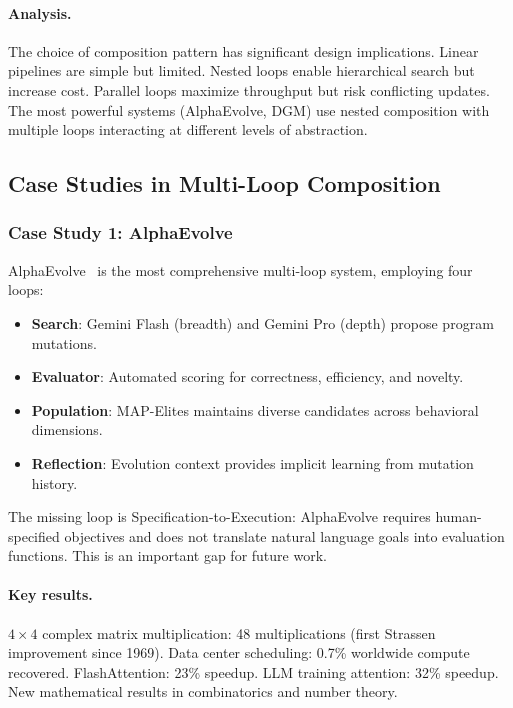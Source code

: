 \paragraph{Analysis.}
The choice of composition pattern has significant design implications. Linear pipelines are simple but limited. Nested loops enable hierarchical search but increase cost. Parallel loops maximize throughput but risk conflicting updates. The most powerful systems (AlphaEvolve, DGM) use nested composition with multiple loops interacting at different levels of abstraction.


\subsection{Case Studies in Multi-Loop Composition}
\label{sec:case-studies}

\subsubsection{Case Study 1: AlphaEvolve}

AlphaEvolve~\citep{novikov2025alphaevolve} is the most comprehensive multi-loop system, employing four loops:

\begin{itemize}
    \item \textbf{Search}: Gemini Flash (breadth) and Gemini Pro (depth) propose program mutations.
    \item \textbf{Evaluator}: Automated scoring for correctness, efficiency, and novelty.
    \item \textbf{Population}: MAP-Elites maintains diverse candidates across behavioral dimensions.
    \item \textbf{Reflection}: Evolution context provides implicit learning from mutation history.
\end{itemize}

The missing loop is Specification-to-Execution: AlphaEvolve requires human-specified objectives and does not translate natural language goals into evaluation functions. This is an important gap for future work.

\paragraph{Key results.}
$4\times4$ complex matrix multiplication: 48 multiplications (first Strassen improvement since 1969). Data center scheduling: 0.7\% worldwide compute recovered. FlashAttention: 23\% speedup. LLM training attention: 32\% speedup. New mathematical results in combinatorics and number theory.

